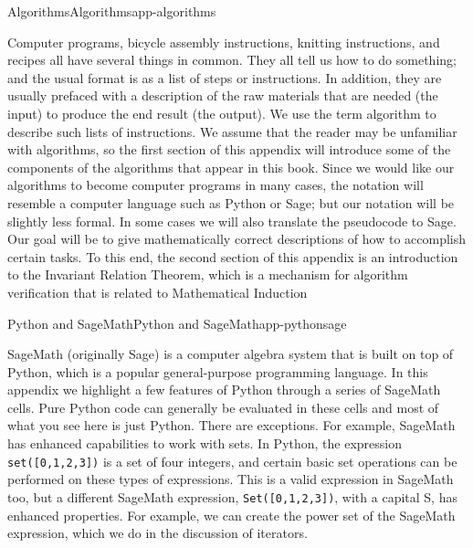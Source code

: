 \documentclass[twoside,10pt,]{book}
\newcommand{\mono}[1]{\texttt{#1}}
\numberwithin{equation}{section}
\begin{document}
%
%
%
\typeout{************************************************}
\typeout{************************************************}
%
%
\appendix
%
\begin{appendixptx}{Algorithms}{}{Algorithms}{}{}{app-algorithms}
\begin{introduction}{}%
\hypertarget{p-6118}{}%
Computer programs, bicycle assembly instructions, knitting instructions, and recipes all have several things in common. They all tell us how to do something; and the usual format is as a list of steps or instructions. In addition, they are usually prefaced with a description of the raw materials that are needed (the input) to produce the end result (the output). We use the term algorithm to describe  such lists of instructions.   We assume that the reader may be unfamiliar with algorithms, so the first section of this appendix will introduce some of the components of the algorithms that appear in this book. Since we would like our algorithms to become computer programs in many cases, the notation will resemble a computer language such as Python or Sage; but our notation will be slightly less formal. In some cases we will also translate the pseudocode to Sage. Our goal will be to give mathematically correct descriptions of how to accomplish certain tasks.  To this end, the second section of this appendix is an introduction to the Invariant Relation Theorem, which is a mechanism for algorithm verification that is related to Mathematical Induction%
\end{introduction}%
\end{appendixptx}
%
%
\typeout{************************************************}
\typeout{************************************************}
%
\begin{appendixptx}{Python and SageMath}{}{Python and SageMath}{}{}{app-pythonsage}
\begin{introduction}{}%
\hypertarget{p-6168}{}%
SageMath (originally Sage) is a computer algebra system that is built on top of Python, which is a popular general-purpose programming language.  In this appendix we highlight a few features of Python through a series of SageMath cells.   Pure Python code can generally be evaluated in these cells and most of what you see here is just Python.   There are exceptions. For example, SageMath has  enhanced capabilities to work with sets.  In Python, the expression \mono{set([0,1,2,3])} is a set of four integers, and certain basic set operations can be performed on these types of expressions.  This is a valid expression in SageMath too, but a different SageMath expression, \mono{Set([0,1,2,3])}, with a capital S, has enhanced properties.  For example, we can create the power set of the SageMath expression, which we do in the discussion of iterators.%
\end{introduction}%
\end{appendixptx}
\end{document}
